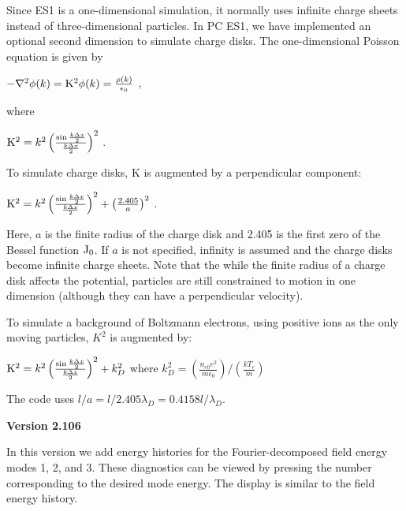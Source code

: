 \begin{section}
\begin{subsection}
\begin{subsubsection}
\noindent
      Since ES1 is a one-dimensional simulation, it normally uses infinite
      charge sheets instead of three-dimensional particles.  In PC ES1, we have
      implemented an optional second dimension to simulate charge disks.   The
      one-dimensional Poisson equation is given by
\begin{center}
	{$-\nabla^{2}\phi(k) = {\rm K}^{2}\phi(k) =
	{\rho(k) \over \epsilon_{0}}$} , 
\end{center}
\noindent
	where
\begin{center}
	{${\rm K}^{2} = k^{2} \left( {\sin{k \Delta x \over 2} \over 
	{k \Delta x \over 2}} \right) ^{2}$} .
\end{center}
\noindent
	To simulate charge disks, K is augmented by a perpendicular component:
\begin{center}
	{${\rm K}^{2} = k^{2} \left( {\sin{k \Delta x \over 2} \over 
	{k \Delta x \over 2}} \right ) ^{2} + \left( 2.405 \over a \right)^{2}$		} .
\end{center}
\noindent
      Here, $a$ is the finite radius of the charge disk and 2.405 is the first
      zero of the Bessel function ${\rm J}_{0}$.  If $a$ is not specified, infinity is
      assumed and the charge disks become infinite charge sheets.  Note that
      the while the finite radius of a charge disk affects the potential,
      particles are still constrained to motion in one dimension (although they
      can have a perpendicular velocity).

\noindent
To simulate a background of Boltzmann electrons, using positive ions as the only
moving particles, $K^2$ is augmented by:
\begin{center}
	{${\rm K}^{2} = k^{2} \left( {\sin{k \Delta x \over 2} \over 
	{k \Delta x \over 2}} \right ) ^{2} + k_D^2$ } where
	$k^2_D = \left( \frac{ n_{e0}e^2}{m\epsilon_0}\right)/ \left( \frac{kT_e}{m}\right)$
\end{center}
\noindent
The code uses $l/a = l/2.405{\lambda_D}=0.4158l/\lambda_D$.
\end{subsubsection}

\begin{subsubsection}
{\bf Version 2.106}

      In this version we add energy histories for the Fourier-decomposed field
      energy modes 1, 2, and 3.  These diagnostics can be viewed by pressing
      the number corresponding to the desired mode energy.  The display is
      similar to the field energy history.
\end{subsubsection}


\end{subsection}
\end{section}
